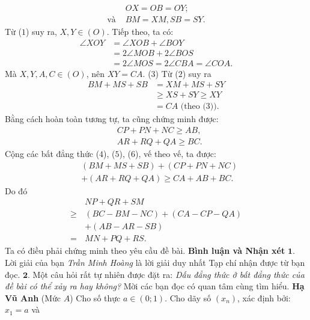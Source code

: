 \begin{multicols}{2}
	\begin{align*}
		&OX = OB = OY; \tag{$1$}\\
		\text{và } &BM = XM, SB = SY. \tag{$2$}
	\end{align*}
	Từ ($1$) suy ra, $X, Y \in (O)$.
	\vskip 0.05cm
	Tiếp theo, ta có:
	\begin{align*}
		\angle XOY &= \angle XOB + \angle BOY \\
		&= 2\angle MOB + 2\angle BOS \\
		&= 2\angle MOS = 2\angle CBA = \angle COA.
	\end{align*}
	Mà $X, Y, A, C \in (O)$, nên $XY = CA$. \hfill ($3$)
	\vskip 0.05cm
	Từ ($2$) suy ra
	\begin{align*}
		BM + MS + SB &= XM + MS + SY \\
		&\ge XS + SY \ge XY \\
		&= CA \text{ (theo ($3$))}. \tag{$4$}  
	\end{align*}
	Bằng cách hoàn toàn tương tự, ta cũng chứng minh được:
	\begin{align*}
		&CP + PN + NC \ge AB,   \tag{$5$}\\
		&AR + RQ + QA \ge BC.  \tag{$6$}
	\end{align*}                      
	Cộng các bất đẳng thức ($4$), ($5$), ($6$), vế theo vế, ta được:
	\begin{align*}
		&(BM + MS + SB) + (CP + PN + NC) \\
		&+ (AR + RQ + QA) \ge CA + AB + BC.	
	\end{align*}
	Do đó
	\begin{align*}
		&NP + QR + SM\\
		\ge &(BC - BM - NC) + (CA - CP - QA) \\
		&+ (AB - AR - SB)\\
		= \,&MN + PQ + RS.
	\end{align*}
	Ta có điều phải chứng minh theo yêu cầu đề bài.
	\vskip 0.05cm
	\textbf{\color{thachthuctoanhoc}Bình luận và Nhận xét}
	\vskip 0.05cm
	$\pmb{1.}$ Lời giải của bạn \textit{Trần Minh Hoàng} là lời giải duy nhất Tạp chí nhận được từ bạn đọc.
	\vskip 0.05cm
	$\pmb{2.}$ Một câu hỏi rất tự nhiên được đặt ra: \textit{Dấu đẳng thức ở bất đẳng thức của đề bài có thể xảy ra hay không?} Mời các bạn đọc có quan tâm cùng tìm hiểu.
	\vskip 0.05cm
	\hfill	\textbf{\color{thachthuctoanhoc}Hạ Vũ Anh}
	\vskip 0.05cm
	{}
	(Mức $A$) Cho số thực $a\in(0;1)$. Cho dãy số $(x_n)$, xác định bởi: $x_1=a$  và 
	\begin{align*}

\end{align*}
\end{multicols}
